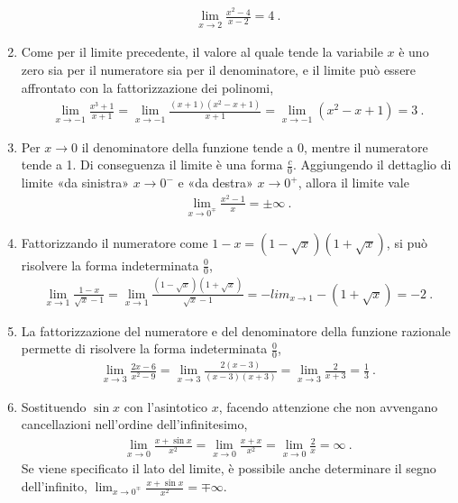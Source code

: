\documentclass[letterpaper,10pt,italian]{jupyterBook}
\begin{document}
\begin{enumerate}
\begin{equation*}
\begin{split}\lim_{x \to 2} \frac{x^2-4}{x-2} = 4 \ .\end{split}
\end{equation*}
\item {} 
\sphinxAtStartPar
Come per il limite precedente, il valore al quale tende la variabile \(x\) è uno zero sia per il numeratore sia per il denominatore, e il limite può essere affrontato con la fattorizzazione dei polinomi,
\begin{equation*}
\begin{split}\lim_{x \to -1} \frac{x^3+1}{x+1} = \lim_{x \to -1} \frac{(x+1)(x^2-x+1)}{x+1} = \lim_{x \to -1} \left( x^2-x+1 \right) = 3 \ .\end{split}
\end{equation*}
\item {} 
\sphinxAtStartPar
Per \(x \to 0\) il denominatore della funzione tende a \(0\), mentre il numeratore tende a \sphinxhyphen{}1. Di conseguenza il limite è una forma \(\frac{c}{0}\). Aggiungendo il dettaglio di limite «da sinistra» \(x \to 0^-\) e «da destra» \(x \to 0^+\), allora il limite vale
\begin{equation*}
\begin{split}\lim_{x \to 0^{\mp}} \frac{x^2 - 1}{x} = \pm \infty \ .\end{split}
\end{equation*}
\item {} 
\sphinxAtStartPar
Fattorizzando il numeratore come \(1 - x = (1-\sqrt{x})(1+\sqrt{x})\), si può risolvere la forma indeterminata \(\frac{0}{0}\),
\begin{equation*}
\begin{split}\lim_{x \to 1} \frac{1-x}{\sqrt{x}-1} = \lim_{x \to 1} \frac{(1-\sqrt{x})(1+\sqrt{x})}{\sqrt{x}-1} = - lim_{x \to 1} -(1+\sqrt{x}) = - 2 \ .\end{split}
\end{equation*}
\item {} 
\sphinxAtStartPar
La fattorizzazione del numeratore e del denominatore della funzione razionale permette di risolvere la forma indeterminata \(\frac{0}{0}\),
\begin{equation*}
\begin{split}\lim_{x \to 3} \frac{2x - 6}{x^2 - 9} = \lim_{x \to 3} \frac{2(x-3)}{(x-3)(x+3)} = \lim_{x \to 3} \frac{2}{x+3} = \frac{1}{3} \ .\end{split}
\end{equation*}
\item {} 
\sphinxAtStartPar
Sostituendo \(\sin x\) con l’asintotico \(x\), facendo attenzione che non avvengano cancellazioni nell’ordine dell’infinitesimo,
\begin{equation*}
\begin{split}\lim_{x \to 0} \frac{x + \sin x}{x^2} = \lim_{x \to 0} \frac{x + x}{x^2} = \lim_{x \to 0} \frac{2}{x} = \infty \ .\end{split}
\end{equation*}
\sphinxAtStartPar
Se viene specificato il lato del limite, è possibile anche determinare il segno dell’infinito, \(\lim_{x \to 0^{\mp}} \frac{x + \sin x}{x^2} = \mp \infty\).


\end{enumerate}
\end{document}
